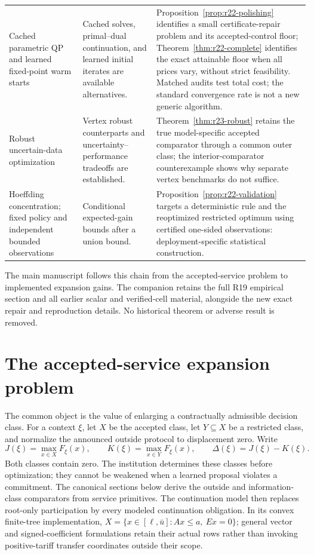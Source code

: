 \documentclass[11pt,letterpaper]{article}
\theoremstyle{definition}
\newcommand{\1}{\mathbf 1}
\begin{document}
\begin{table}[tbp]
\begin{tabular}{p{}p{}p{}}
Cached parametric QP and learned fixed-point warm starts \citep{Stellato2020,Sambharya2024}
& Cached solves, primal--dual continuation, and learned initial iterates are available alternatives.
& Proposition~\ref{prop:r22-polishing} identifies a small certificate-repair problem and its accepted-control floor; Theorem~\ref{thm:r22-complete} identifies the exact attainable floor when all prices vary, without strict feasibility. Matched audits test total cost; the standard convergence rate is not a new generic algorithm.\\
Robust uncertain-data optimization \citep{BenTalNemirovski2000,BertsimasSim2004}
& Vertex robust counterparts and uncertainty--performance tradeoffs are established.
& Theorem~\ref{thm:r23-robust} retains the true model-specific accepted comparator through a common outer class; the interior-comparator counterexample shows why separate vertex benchmarks do not suffice.\\
Hoeffding concentration; fixed policy and independent bounded observations \citep{Hoeffding1963}
& Conditional expected-gain bounds after a union bound.
& Proposition~\ref{prop:r22-validation} targets a deterministic rule and the reoptimized restricted optimum using certified one-sided observations: deployment-specific statistical construction.\\
\bottomrule
\end{tabular}
\end{table}

The main manuscript follows this chain from the accepted-service problem to implemented expansion gains. The companion retains the full R19 empirical section and all earlier scalar and verified-cell material, alongside the new exact repair and reproduction details. No historical theorem or adverse result is removed.

\section{The accepted-service expansion problem}\label{sec:r22-early}
The common object is the value of enlarging a contractually admissible decision class. For a context $\xi$, let $X$ be the accepted class, let $Y\subseteq X$ be a restricted class, and normalize the announced outside protocol to displacement zero. Write
\begin{equation}\label{eq:r22-common}
 J(\xi)=\max_{x\in X}F_\xi(x),\qquad
 K(\xi)=\max_{x\in Y}F_\xi(x),\qquad
 \Delta(\xi)=J(\xi)-K(\xi).
\end{equation}
Both classes contain zero. The institution determines these classes before optimization; they cannot be weakened when a learned proposal violates a commitment. The canonical sections below derive the outside and information-class comparators from service primitives. The continuation model then replaces root-only participation by every modeled continuation obligation. In its convex finite-tree implementation,
$X=\{x\in[\ell,\bar u]:Ax\leq a,\ Ex=0\}$; general vector and signed-coefficient formulations retain their actual rows rather than invoking positive-tariff transfer coordinates outside their scope.
\end{document}

